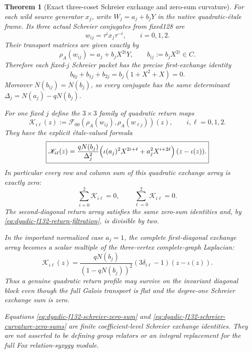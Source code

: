 \documentclass[11pt]{article}
\newtheorem{theorem}{Theorem}[section]
\theoremstyle{definition}
\begin{document}
\begin{theorem}[Exact three-coset Schreier exchange and zero-sum curvature]
\label{thm:dyadic-f132-schreier-exchange}
For each wild source generator
$x_j$, write
$W_j=a_j+b_jY$ in
the native quadratic-\'etale
frame.  Its three
actual Schreier conjugates
from fixed128 are
\[
w_{ij}=\tau^i x_j\tau^{-i},
\qquad i=0,1,2.
\]
Their transport matrices
are given \emph{exactly} by
\begin{equation}\label{eq:dyadic-f132-schreier-wild-packet}
\boxed{\quad
\rho_A(w_{ij})
=a_j+b_jX^{2i}Y,
\qquad
b_{ij}:=b_jX^{2i}\in C.
\quad}
\end{equation}
Therefore each fixed-$j$
Schreier packet has the
precise first-exchange
identity
\begin{equation}\label{eq:dyadic-f132-schreier-zero-sum}
\boxed{\qquad
b_{0j}+b_{1j}+b_{2j}
=b_j(1+X^2+X)=0.
\qquad}
\end{equation}
Moreover
$N(b_{ij})=N(b_j)$,
so every conjugate has
the same determinant
$\Delta_j=N(a_j)-qN(b_j)$.

For one fixed $j$ define
the $3\times3$ family of
quadratic return maps
\[
\mathscr K_{i\ell}(z)
:=\mathscr F_{00}
(\rho_A(w_{ij}),
 \rho_A(w_{\ell j}))(z),
\qquad i,\ell=0,1,2.
\]
They have the explicit
\'etale-valued formula
\begin{equation}\label{eq:dyadic-f132-schreier-quadratic-array}
\boxed{
\begin{aligned}
\mathscr K_{i\ell}(z)
=\frac{qN(b_j)}{\Delta_j^2}
\Bigl(
 \iota(a_j)^2X^{2i+\ell}
 +a_j^2X^{i+2\ell}
\Bigr)\,(z-\iota(z)).
\end{aligned}}
\end{equation}
In particular \emph{every}
row and column sum
of this quadratic
exchange array
is exactly zero:
\begin{equation}\label{eq:dyadic-f132-schreier-curvature-zero-sums}
\boxed{\quad
\sum_{i=0}^2\mathscr K_{i\ell}=0,
\qquad
\sum_{\ell=0}^2\mathscr K_{i\ell}=0.
\quad}
\end{equation}
The second-diagonal
return array satisfies
the same zero-sum
identities and, by
\eqref{eq:dyadic-f132-return-filtration},
is divisible by two.

In the important
normalized case
$a_j=1$, the complete
first-diagonal
exchange array becomes
a scalar multiple of
the three-vertex
complete-graph Laplacian:
\begin{equation}\label{eq:dyadic-f132-schreier-k3-laplacian}
\boxed{
\mathscr K_{i\ell}(z)
=
\frac{qN(b_j)}
{(1-qN(b_j))^2}
(3\delta_{i\ell}-1)
(z-\iota(z)).
}
\end{equation}
Thus a genuine
quadratic return
profile may survive
on the invariant
diagonal block
even though the
full Galois transport
is flat and the
degree-one Schreier
exchange sum is zero.

Equations
\eqref{eq:dyadic-f132-schreier-zero-sum}
and
\eqref{eq:dyadic-f132-schreier-curvature-zero-sums}
are finite
\emph{coefficient-level}
Schreier exchange
identities.  They
are not asserted to
be defining group
relators or an
integral replacement
for the full Fox
relation-syzygy module.
\end{theorem}
\end{document}
